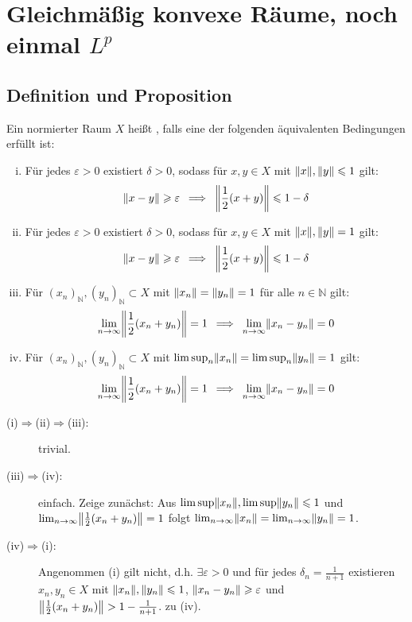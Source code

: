 \section{Gleichmäßig konvexe Räume, noch einmal $L^p$} %
\label{sec:6}

\subsection[Definition und Proposition: Gleichmäßig konvexer Raum]{Definition und Proposition} %
\label{sub:61}
Ein normierter Raum $X$ heißt , falls eine der folgenden äquivalenten Bedingungen erfüllt ist:
\begin{enumerate}[(i)]
	\item Für jedes $\varepsilon>0$ existiert $\delta >0$, sodass für $x,y \in X$ mit $\norm{x}, \norm{y} \le 1$ gilt:
	\[
		\norm{x-y} \ge \varepsilon \enspace\Longrightarrow \enspace\norm{\frac{1}{2} (x+y) } \le 1 -\delta 
	\]
	\item \label{61:enum:2} Für jedes $\varepsilon>0$ existiert $\delta >0$, sodass für $x,y \in X$ mit $\norm{x}, \norm{y}= 1$ gilt:
	\[
		\norm{x-y} \ge \varepsilon \enspace\Longrightarrow \enspace\norm{\frac{1}{2} (x+y)} \le 1-\delta   
	\]
	\item Für $(x_n)_\mathds{N}, (y_n)_\mathds{N} \subset X$ mit $\norm{x_n} = \norm{y_n}=1$ für alle $n \in \mathds{N}$ gilt: 
	\[
		\lim_{ n \to \infty} \norm{\frac{1}{2} (x_n+y_n)}=1 \enspace\Longrightarrow \enspace\lim_{ n \to \infty} \norm{x_n- y_n}=0  
	\]
	\item Für $(x_n)_\mathds{N}, (y_n)_\mathds{N} \subset X$ mit $\limsup_n \norm{x_n} = \limsup_n \norm{y_n}=1$ gilt:
	\[
		\lim_{ n \to \infty} \norm{\frac{1}{2} (x_n+y_n)}=1 \enspace\Longrightarrow \enspace\lim_{ n \to \infty} \norm{x_n- y_n}=0  
	\]
\end{enumerate}
\begin{description}
	\item[(i)$\Rightarrow$(ii)$\Rightarrow$(iii):] trivial.
	\item[(iii)$\Rightarrow$(iv):] einfach. Zeige zunächst: Aus $\limsup \norm{x_n}, \limsup \norm{y_n}\le 1$ und $\lim_{ n \to \infty} \norm{\frac{1}{2} (x_n+y_n)}=1$
	folgt $\lim_{ n \to \infty} \norm{x_n}=\lim_{ n \to \infty} \norm{y_n}=1$.
	\item[(iv)$\Rightarrow$(i):] Angenommen (i) gilt nicht, d.h. $\exists \varepsilon>0$ und für jedes $\delta_n=\frac{1}{n+1}$ existieren $x_n,y_n \in X$ mit 
	$\norm{x_n}, \norm{y_n}\le 1$, $\norm{x_n-y_n}\ge \varepsilon$ und $\norm{\frac{1}{2}(x_n+y_n)} > 1- \frac{1}{n+1}$. \light zu (iv). \bewende
\end{description}

